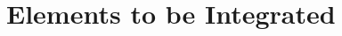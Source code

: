 \documentclass[../../../../testPlan.tex]{subfiles}
\begin{document}
	\section{Elements to be Integrated}
\end{document}
